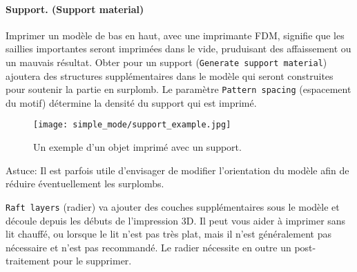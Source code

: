 
\paragraph{Support. (Support material)} %
\label{par:simple_support_material}
Imprimer un mod\`ele de bas en haut, avec une imprimante FDM, signifie que les saillies importantes seront imprim\'ees dans le vide, pruduisant des affaissement ou un mauvais r\'esultat.  Obter pour un support (\texttt{Generate support material}) ajoutera des structures suppl\'ementaires dans le mod\`ele qui seront construites pour soutenir la partie en surplomb. Le param\`etre \texttt{Pattern spacing} (espacement du motif) d\'etermine la densit\'e du support qui est imprim\'e.

\begin{figure}[H]
\centering
\texttt{[image: simple\_mode/support\_example.jpg]}
\caption{Un exemple d'un objet imprim\'e avec un support.}
\label{fig:support_example}
\end{figure}

Astuce: Il est parfois utile d'envisager de modifier l'orientation du mod\`ele afin de r\'eduire \'eventuellement les surplombs.

\texttt{Raft layers} (radier) va ajouter des couches suppl\'ementaires sous le mod\`ele et d\'ecoule depuis les d\'ebuts de l'impression 3D. Il peut vous aider \`a imprimer sans lit chauff\'e, ou lorsque le lit n'est pas tr\`es plat, mais il n'est g\'en\'eralement pas n\'ecessaire et n'est pas recommand\'e. Le radier n\'ecessite en outre un post-traitement pour le supprimer.

